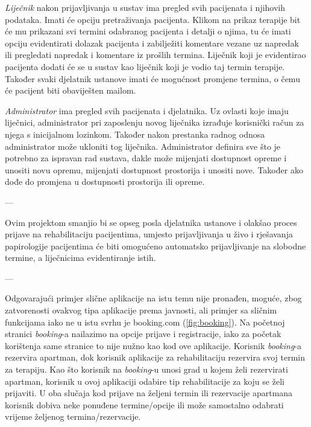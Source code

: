 		\textit{Liječnik} nakon prijavljivanja u sustav ima pregled svih pacijenata i njihovih podataka. Imati će opciju pretraživanja pacijenta. Klikom na prikaz terapije bit će mu prikazani svi termini odabranog pacijenta i detalji o njima, tu će imati opciju evidentirati dolazak pacijenta i zabilježiti komentare vezane uz napredak ili pregledati napredak i komentare iz prošlih termina. Liječnik koji je evidentirao pacijenta dodati će se u sustav kao liječnik koji je vodio taj termin terapije. Također svaki djelatnik ustanove imati će mogućnost promjene termina, o čemu će pacijent biti obaviješten mailom. 
		
		\textit{Administrator} ima pregled svih pacijenata i djelatnika. Uz ovlasti koje imaju liječnici, administrator pri zaposlenju novog liječnika izrađuje korisnički račun za njega s inicijalnom lozinkom. Također nakon prestanka radnog odnosa administrator može ukloniti tog liječnika. Administrator definira sve što je potrebno za ispravan rad sustava, dakle može mijenjati dostupnost opreme i unositi novu opremu, mijenjati dostupnost prostorija i unositi nove. Također ako dođe do promjena u dostupnosti prostorija ili opreme.
		
		---
		
		Ovim projektom smanjio bi se opseg posla djelatnika ustanove i olakšao proces prijave na rehabilitaciju pacijentima, umjesto prijavljivanja u živo i rješavanja papirologije pacijentima će biti omogućeno automatsko prijavljivanje na slobodne termine, a liječnicima evidentiranje istih. 
		
		---
		
		Odgovarajući primjer slične aplikacije na istu temu nije pronađen, moguće, zbog zatvorenosti ovakvog tipa aplikacije prema javnosti, ali primjer sa sličnim funkcijama iako ne u istu svrhu je booking.com (\ref{fig:booking}). Na početnoj stranici \textit{booking}-a nailazimo na opcije prijave i registracije, iako za početak korištenja same stranice to nije nužno kao kod ove aplikacije. Korisnik \textit{booking}-a rezervira apartman, dok korisnik aplikacije za rehabilitaciju rezervira svoj termin za terapiju. Kao što korisnik na \textit{booking}-u unosi grad u kojem želi rezervirati apartman, korisnik u ovoj aplikaciji odabire tip rehabilitacije za koju se želi prijaviti. U oba slučaja kod prijave na željeni termin ili rezervacije apartmana korisnik dobiva neke ponuđene termine/opcije ili može samostalno odabrati vrijeme željenog termina/rezervacije. 
		
